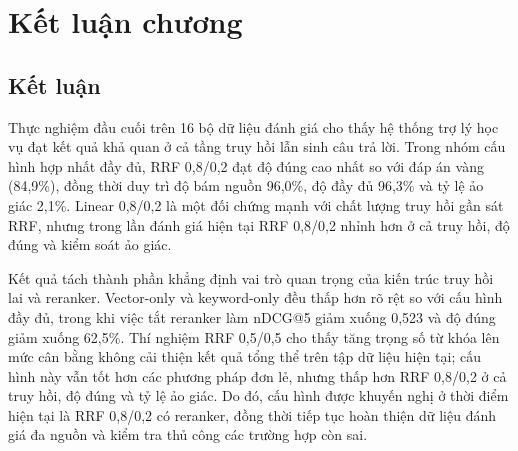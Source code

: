 \documentclass[../DoAn.tex]{subfiles}
\begin{document}
\section{Kết luận chương}

\subsection{Kết luận}

Thực nghiệm đầu cuối trên 16 bộ dữ liệu đánh giá cho thấy hệ thống trợ lý học
vụ đạt kết quả khả quan ở cả tầng truy hồi lẫn sinh câu trả lời. Trong nhóm
cấu hình hợp nhất đầy đủ, RRF 0,8/0,2 đạt độ đúng cao nhất so với đáp án vàng
(84,9\%), đồng thời duy trì độ bám nguồn 96,0\%, độ đầy đủ 96,3\% và tỷ lệ
ảo giác 2,1\%. Linear 0,8/0,2 là một đối chứng mạnh với chất lượng truy hồi
gần sát RRF, nhưng trong lần đánh giá hiện tại RRF 0,8/0,2 nhỉnh hơn ở cả
truy hồi, độ đúng và kiểm soát ảo giác.

Kết quả tách thành phần khẳng định vai trò quan trọng của kiến trúc truy hồi
lai và reranker. Vector-only và keyword-only đều thấp hơn rõ rệt so với cấu
hình đầy đủ, trong khi việc tắt reranker làm nDCG@5 giảm xuống 0,523 và độ đúng
giảm xuống 62,5\%. Thí nghiệm RRF 0,5/0,5 cho thấy tăng trọng số từ khóa lên
mức cân bằng không cải thiện kết quả tổng thể trên tập dữ liệu hiện tại; cấu
hình này vẫn tốt hơn các phương pháp đơn lẻ, nhưng thấp hơn RRF 0,8/0,2 ở cả
truy hồi, độ đúng và tỷ lệ ảo giác. Do đó, cấu hình được khuyến nghị ở thời
điểm hiện tại là RRF 0,8/0,2 có reranker, đồng thời tiếp tục hoàn thiện dữ liệu
đánh giá đa nguồn và kiểm tra thủ công các trường hợp còn sai.
\end{document}
